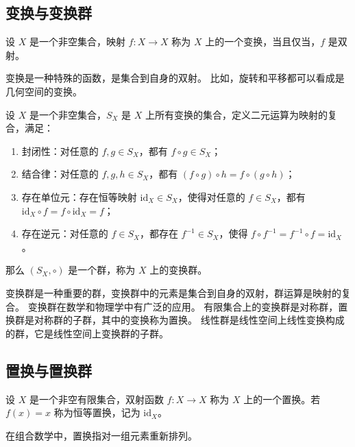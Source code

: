 \subsection{变换与变换群}
\begin{definition}[变换 Transformation]
    设 $X$ 是一个非空集合，映射 $f: X \to X$ 称为 $X$ 上的一个变换，当且仅当，$f$ 是双射。
\end{definition}
\begin{note}
    变换是一种特殊的函数，是集合到自身的双射。
    比如，旋转和平移都可以看成是几何空间的变换。
\end{note}
\vspace{1em}

\begin{definition}
    设 $X$ 是一个非空集合，$S_X$ 是 $X$ 上所有变换的集合，定义二元运算为映射的复合，满足：
    \begin{enumerate}
        \item 封闭性：对任意的 $f, g\in S_X$，都有 $f \circ g \in S_X$；
        \item 结合律：对任意的 $f, g, h\in S_X$，都有 $(f \circ g) \circ h = f \circ (g \circ h)$；
        \item 存在单位元：存在恒等映射 $\mathrm{id}_X\in S_X$，使得对任意的 $f\in S_X$，都有 $\mathrm{id}_X \circ f = f \circ \mathrm{id}_X = f$；
        \item 存在逆元：对任意的 $f\in S_X$，都存在 $f^{-1}\in S_X$，使得 $f \circ f^{-1} = f^{-1} \circ f = \mathrm{id}_X$。
    \end{enumerate}    
    那么 $(S_X, \circ)$ 是一个群，称为 $X$ 上的变换群。
\end{definition}

\begin{note}
    变换群是一种重要的群，变换群中的元素是集合到自身的双射，群运算是映射的复合。
    变换群在数学和物理学中有广泛的应用。
    有限集合上的变换群是对称群，置换群是对称群的子群，其中的变换称为置换。
    线性群是线性空间上线性变换构成的群，它是线性空间上变换群的子群。
\end{note}
\vspace{1em}

\vspace{1em}
\subsection{置换与置换群}
\begin{definition}[置换 Permutation]
    设 $X$ 是一个非空有限集合，双射函数 $f: X \to X$ 称为 $X$ 上的一个置换。若 $f(x)=x$ 称为恒等置换，记为 $\mathrm{id}_X$。
\end{definition}
\begin{note}
    在组合数学中，置换指对一组元素重新排列。
\end{note}

